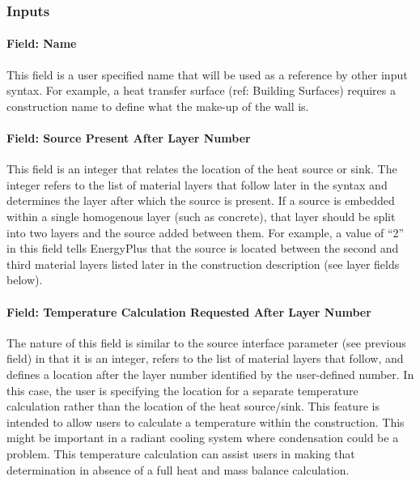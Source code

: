 \subsubsection{Inputs}\label{inputs-38}

\paragraph{Field: Name}\label{field-name-31-000}

This field is a user specified name that will be used as a reference by other input syntax. For example, a heat transfer surface (ref: Building Surfaces) requires a construction name to define what the make-up of the wall is.

\paragraph{Field: Source Present After Layer Number}\label{field-source-present-after-layer-number}

This field is an integer that relates the location of the heat source or sink. The integer refers to the list of material layers that follow later in the syntax and determines the layer after which the source is present. If a source is embedded within a single homogenous layer (such as concrete), that layer should be split into two layers and the source added between them. For example, a value of ``2'' in this field tells EnergyPlus that the source is located between the second and third material layers listed later in the construction description (see layer fields below).

\paragraph{Field: Temperature Calculation Requested After Layer Number}\label{field-temperature-calculation-requested-after-layer-number}

The nature of this field is similar to the source interface parameter (see previous field) in that it is an integer, refers to the list of material layers that follow, and defines a location after the layer number identified by the user-defined number. In this case, the user is specifying the location for a separate temperature calculation rather than the location of the heat source/sink. This feature is intended to allow users to calculate a temperature within the construction. This might be important in a radiant cooling system where condensation could be a problem. This temperature calculation can assist users in making that determination in absence of a full heat and mass balance calculation.

